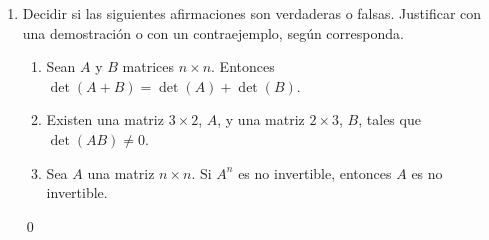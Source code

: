 \begin{enumerate}[topsep=6pt,itemsep=.4cm]
    
    \begin{enumerate}
        \item Si $n=2$, probar que $\det(\mathtt V) = \lambda_2-\lambda_1$.
        \item Si $n=3$, probar que $\det(\mathtt V) = (\lambda_3-\lambda_2) (\lambda_3-\lambda_1) (\lambda_2-\lambda_1)$.
        \item\label{vandermonde gral} $\textcircled{a}$ Probar que $\det(\mathtt V) = \prod_{1\leq i< j \leq n}(\lambda_j-\lambda_i)$ para todo $n\in\mathbb{N}$.
        \item Dar una condición necesaria y suficiente para que la matriz de Vandermonde sea invertible.
        \item Usar lo anterior para responder a la pregunta del ejercicio \ref{polinomios}\,\ref{polinomios-b} del Práctico \ref{practico-2}.
        \end{enumerate}
    \rta

    \qed
        
    \item Decidir si las siguientes afirmaciones son verdaderas o falsas. Justificar con una demostración o con un contraejemplo, según corresponda.
        \begin{enumerate}
        \item Sean $A$ y $B$ matrices $n \times n$. Entonces $\det(A + B) = \det (A) + \det(B)$.
        \item Existen una matriz $3\times 2$, $A$, y una matriz $2\times 3$, $B$, tales que $\det(AB) \neq 0$.
        \item Sea $A$ una matriz $n\times n$. Si $A^n$ es no invertible, entonces $A$ es no invertible.
    \end{enumerate}
    \rta

    \qed
    
    \end{enumerate}
    